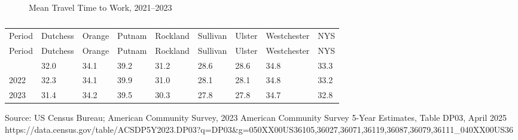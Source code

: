 \documentclass[
  english,
  letterpaper,
]{report}
\begin{document}
\begin{figure}


\caption{\label{fig-mean-time-work}Mean Travel Time to Work, 2021--2023}

\end{figure}%

\begin{longtable}[]{@{}lllllllll@{}}

\caption{\label{tbl-mean-time-work}Mean Travel Time to Work, 2021--2023}

\tabularnewline

\caption{}\label{T_1e64d}\tabularnewline
\toprule\noalign{}
Period & Dutchess & Orange & Putnam & Rockland & Sullivan & Ulster &
Westchester & NYS \\
\midrule\noalign{}
\endfirsthead
\toprule\noalign{}
Period & Dutchess & Orange & Putnam & Rockland & Sullivan & Ulster &
Westchester & NYS \\
\midrule\noalign{}
\endhead
\bottomrule\noalign{}
\endlastfoot
2021 & 32.0 & 34.1 & 39.2 & 31.2 & 28.6 & 28.6 & 34.8 & 33.3 \\
2022 & 32.3 & 34.1 & 39.9 & 31.0 & 28.1 & 28.1 & 34.8 & 33.2 \\
2023 & 31.4 & 34.2 & 39.5 & 30.3 & 27.8 & 27.8 & 34.7 & 32.8 \\

\end{longtable}

\begin{tcolorbox}[enhanced jigsaw, breakable, leftrule=.75mm, title=\textcolor{quarto-callout-note-color}{\faInfo}\hspace{0.5em}{Source}, bottomrule=.15mm, opacityback=0, left=2mm, colback=white, bottomtitle=1mm, coltitle=black, colbacktitle=quarto-callout-note-color!10!white, colframe=quarto-callout-note-color-frame, opacitybacktitle=0.6, toptitle=1mm, titlerule=0mm, arc=.35mm, rightrule=.15mm, toprule=.15mm]

Source: US Census Bureau; American Community Survey, 2023 American
Community Survey 5-Year Estimates, Table DP03, April 2025
https://data.census.gov/table/ACSDP5Y2023.DP03?q=DP03\&g=050XX00US36105,36027,36071,36119,36087,36079,36111\_040XX00US36

\end{tcolorbox}
\end{document}
